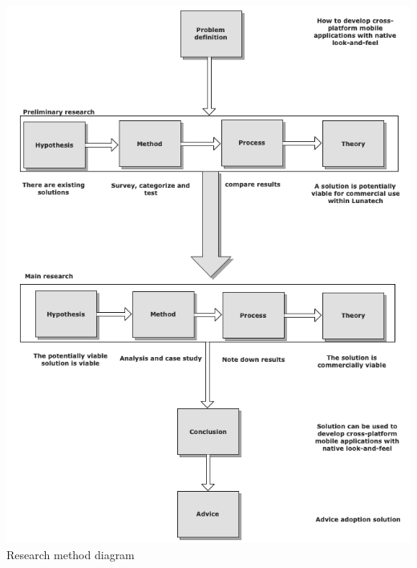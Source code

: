 
\newpage
\begin{centering}
\includegraphics[scale=0.6]{images/researchprocess.png}\\{Research method diagram}\\
\end{centering}


